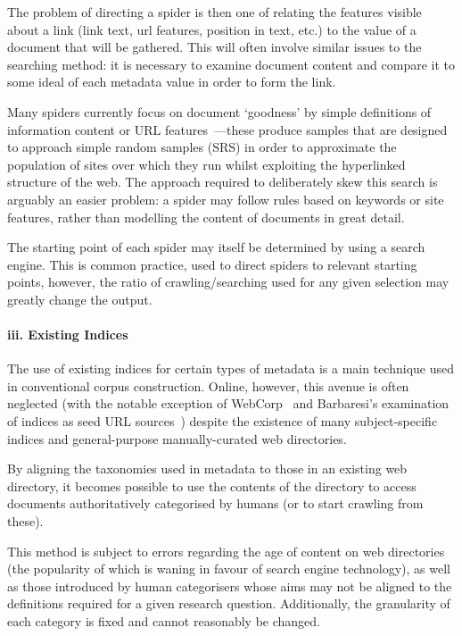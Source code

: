 The problem of directing a spider is then one of relating the features visible about a link (link text, url features, position in text, etc.) to the value of a document that will be gathered.  This will often involve similar issues to the searching method: it is necessary to examine document content and compare it to some ideal of each metadata value in order to form the link.

Many spiders currently focus on document `goodness' by simple definitions of information content or URL features~\cite{schafer2014focused,ferraresi2008introducing,belikov2013big}---these produce samples that are designed to approach simple random samples (SRS) in order to approximate the population of sites over which they run whilst exploiting the hyperlinked structure of the web.  The approach required to deliberately skew this search is arguably an easier problem: a spider may follow rules based on keywords or site features, rather than modelling the content of documents in great detail.

The starting point of each spider may itself be determined by using a search engine.  This is common practice, used to direct spiders to relevant starting points, however, the ratio of crawling/searching used for any given selection may greatly change the output.



\paragraph{iii. Existing Indices}
The use of existing indices for certain types of metadata is a main technique used in conventional corpus construction.  Online, however, this avenue is often neglected (with the notable exception of WebCorp~\cite{renouf2003webcorp} and Barbaresi's examination of indices as seed URL sources~\cite{barbaresi2014finding}) despite the existence of many subject-specific indices and general-purpose manually-curated web directories.

By aligning the taxonomies used in metadata to those in an existing web directory, it becomes possible to use the contents of the directory to access documents authoritatively categorised by humans (or to start crawling from these).

This method is subject to errors regarding the age of content on web directories (the popularity of which is waning in favour of search engine technology), as well as those introduced by human categorisers whose aims may not be aligned to the definitions required for a given research question.  Additionally, the granularity of each category is fixed and cannot reasonably be changed.

